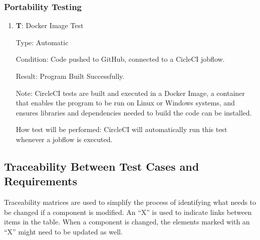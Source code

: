 \documentclass[12pt, titlepage]{article}
\newcounter{testnum} %
\begin{document}
\subsubsection{Portability Testing}

\begin{enumerate}

  \item{\textbf{T\thetestnum \label{T_dockerImage}}: Docker Image Test\\}
            
  Type: Automatic
            
  Condition: Code pushed to GitHub, connected to a CicleCI jobflow.
            
  Result: Program Built Successfully.
            
  Note: CircleCI tests are built and executed in a Docker Image, a container that enables the program to be run on Linux or Windows systems,
  and ensures libraries and dependencies needed to build the code can be installed.
            
  How test will be performed: CircleCI will automatically run this test whenever a jobflow is executed.
\end{enumerate} 

\subsection{Traceability Between Test Cases and Requirements}

Traceability matrices are used to simplify the process of identifying what needs to be changed 
if a component is modified. An ``X'' is used to indicate links between items in the table. 
When a component is changed, the elements marked with an ``X'' might need to be updated as well.
\end{document}
